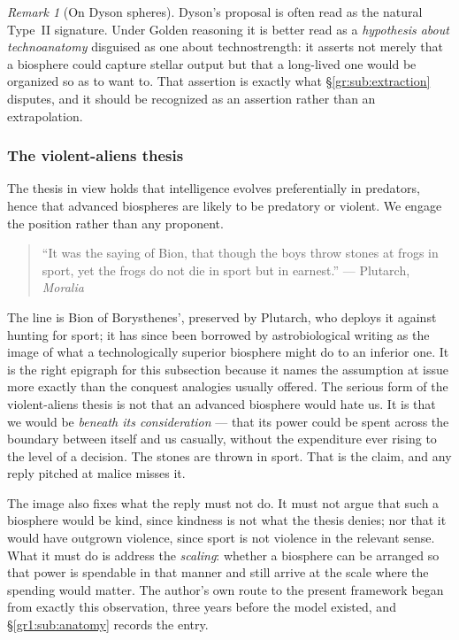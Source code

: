 \documentclass[11pt]{article}
\numberwithin{equation}{section}
\theoremstyle{plain}
\theoremstyle{definition}
\theoremstyle{remark}
\newtheorem{remark}[theorem]{Remark}
\begin{document}
\begin{remark}[On Dyson spheres]\label{gr:rem:dyson}
Dyson's proposal \cite{Dys60} is often read as the natural
Type~II signature. Under Golden reasoning it is better read as a
\emph{hypothesis about technoanatomy} disguised as one about
technostrength: it asserts not merely that a biosphere could capture
stellar output but that a long-lived one would be organized so as to
want to. That assertion is exactly what \S\ref{gr:sub:extraction}
disputes, and it should be recognized as an assertion rather than an
extrapolation.
\end{remark}

\subsubsection{The violent-aliens thesis}\label{gr:subsub:violence}

The thesis in view holds that intelligence evolves preferentially in
predators, hence that advanced biospheres are likely to be predatory or
violent. We engage the position rather than any proponent.

\begin{quote}\small
``It was the saying of Bion, that though the boys throw stones at frogs
in sport, yet the frogs do not die in sport but in earnest.''
\hfill --- Plutarch, \emph{Moralia} \cite{Plutarch}
\end{quote}

\noindent The line is Bion of Borysthenes', preserved by Plutarch, who
deploys it against hunting for sport; it has since been borrowed by
astrobiological writing as the image of what a technologically superior
biosphere might do to an inferior one. It is the right epigraph for this
subsection because it names the assumption at issue more exactly than
the conquest analogies usually offered. The serious form of the
violent-aliens thesis is not that an advanced biosphere would hate us.
It is that we would be \emph{beneath its consideration} --- that its
power could be spent across the boundary between itself and us
casually, without the expenditure ever rising to the level of a
decision. The stones are thrown in sport. That is the claim, and any
reply pitched at malice misses it.

The image also fixes what the reply must not do. It must not argue that
such a biosphere would be kind, since kindness is not what the thesis
denies; nor that it would have outgrown violence, since sport is not
violence in the relevant sense. What it must do is address the
\emph{scaling}: whether a biosphere can be arranged so that power is
spendable in that manner and still arrive at the scale where the
spending would matter. The author's own route to the present framework
began from exactly this observation, three years before the model
existed, and \S\ref{gr1:sub:anatomy} records the entry.
\end{document}
